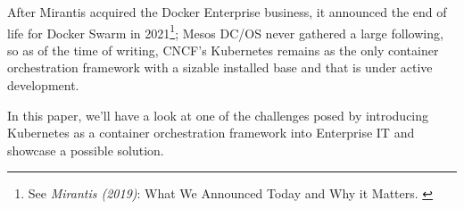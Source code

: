 After Mirantis acquired the Docker Enterprise business, it announced the end of life for Docker Swarm in 2021\footnote{See \textit{Mirantis (2019)}: What We Announced Today and Why it Matters. \cite{mirantisDocker}}; Mesos DC/OS never gathered a large following, so as of the time of writing, CNCF's Kubernetes remains as the only container orchestration framework with a sizable installed base and that is under active development.

In this paper, we'll have a look at one of the challenges posed by introducing Kubernetes as a container orchestration framework into Enterprise IT and showcase a possible solution.
